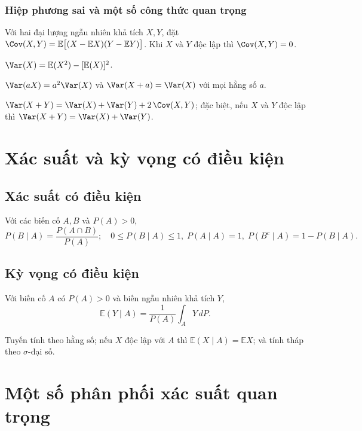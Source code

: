 \subsubsection*{Hiệp phương sai và một số công thức quan trọng}
\begin{dn}
Với hai đại lượng ngẫu nhiên khả tích $X,Y$, đặt $\Cov(X,Y)=\mathbb{E}\big[(X-\mathbb{E}X)(Y-\mathbb{E}Y)\big]$. Khi $X$ và $Y$ độc lập thì $\Cov(X,Y)=0$.
\end{dn}
\begin{dl}
\begin{lietke}
  \item $\Var(X)=\mathbb{E}(X^2)-[\mathbb{E}(X)]^2$.
  \item $\Var(aX)=a^2\Var(X)$ và $\Var(X+a)=\Var(X)$ với mọi hằng số $a$.
  \item $\Var(X+Y)=\Var(X)+\Var(Y)+2\,\Cov(X,Y)$; đặc biệt, nếu $X$ và $Y$ độc lập thì $\Var(X+Y)=\Var(X)+\Var(Y)$.
\end{lietke}
\end{dl}

\section{Xác suất và kỳ vọng có điều kiện}

\subsection{Xác suất có điều kiện}
\begin{dn}
Với các biến cố $A,B$ và $P(A)>0$,
\[
P(B\mid A)=\frac{P(A\cap B)}{P(A)};\quad 0\le P(B\mid A)\le1,\; P(A\mid A)=1,\; P(B^c\mid A)=1-P(B\mid A).
\]
\end{dn}

\subsection{Kỳ vọng có điều kiện}
\begin{dn}
Với biến cố $A$ có $P(A)>0$ và biến ngẫu nhiên khả tích $Y$,
\[
\mathbb{E}(Y\mid A)=\frac{1}{P(A)}\int_A Y\,dP.
\]
\end{dn}
\begin{tinhchat}
Tuyến tính theo hằng số; nếu $X$ độc lập với $A$ thì $\mathbb{E}(X\mid A)=\mathbb{E}X$; và tính tháp theo $\sigma$-đại số.
\end{tinhchat}

\section{Một số phân phối xác suất quan trọng}

